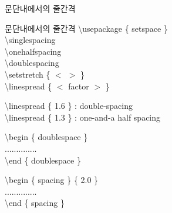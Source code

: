 \documentclass[10pt,xcolor=pdftex,dvipsnames,table,handout]{beamer}
\begin{document}
		\begin{frame}[t,allowframebreaks]{문단내에서의 줄간격}

			\begin{block} {문단내에서의 줄간격}
			\textbackslash usepackage \{ setspace \} \\
			\hfill \textbackslash singlespacing \\
			\hfill \textbackslash onehalfspacing \\
			\hfill \textbackslash doublespacing \\
			\hfill \textbackslash setstretch \{ $<$ $>$ \} \\
			\hfill \textbackslash linespread \{ $<$ factor $>$ \}
			\end{block}

			\begin{example}
			\textbackslash linespread \{ 1.6 \} : double-spacing \\
			\textbackslash linespread \{ 1.3 \} : one-and-a half spacing 
			\end{example}
	
			\newpage
			\begin{example}
			\textbackslash begin \{ doublespace \} \\
			.............. \\
			\textbackslash end \{ doublespace \} \\
			\end{example}

			\begin{example}
			\textbackslash begin \{ spacing \} \{ 2.0 \} \\
			.............. \\
			\textbackslash end \{ spacing \} \\
			\end{example}

		\end{frame}
\end{document}
